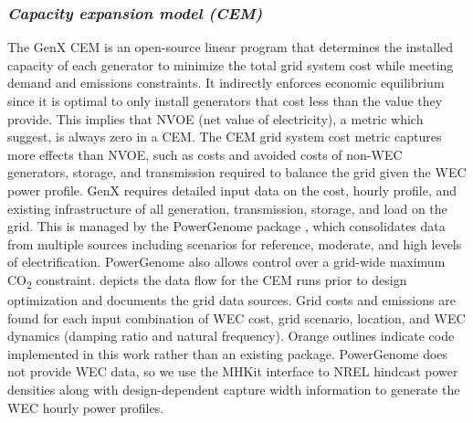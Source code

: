 \subsubsection{\textit{Capacity expansion model (CEM)}}
The GenX CEM \cite{bonaldo_genxprojectgenxjl_2025} is an open-source linear program that determines the installed capacity of each generator to minimize the total grid system cost while meeting demand and emissions constraints.
It indirectly enforces economic equilibrium since it is optimal to only install generators that cost less than the value they provide.
This implies that NVOE (net value of electricity), a metric which \cite{mowers_evaluation_2021,mccabe_system_2023} suggest, is always zero in a CEM.
The CEM grid system cost metric captures more effects than NVOE, such as costs and avoided costs of non-WEC generators, storage, and transmission required to balance the grid given the WEC power profile.
GenX requires detailed input data on the cost, hourly profile, and existing infrastructure of all generation, transmission, storage, and load on the grid.
This is managed by the PowerGenome package \cite{schivley_powergenomepowergenome_2025}, which consolidates data from multiple sources including scenarios for reference, moderate, and high levels of electrification.
PowerGenome also allows control over a grid-wide maximum CO\textsubscript{2} constraint.
 depicts the data flow for the CEM runs prior to design optimization and documents the grid data sources.
Grid costs and emissions are found for each input combination of WEC cost, grid scenario, location, and WEC dynamics (damping ratio and natural frequency).
Orange outlines indicate code implemented in this work rather than an existing package.
PowerGenome does not provide WEC data, so we use the MHKit interface \cite{klise_mhkit_2020} to NREL hindcast power densities \cite{wu_development_2020,allahdadi_development_2019} along with design-dependent capture width information to generate the WEC hourly power profiles. 
